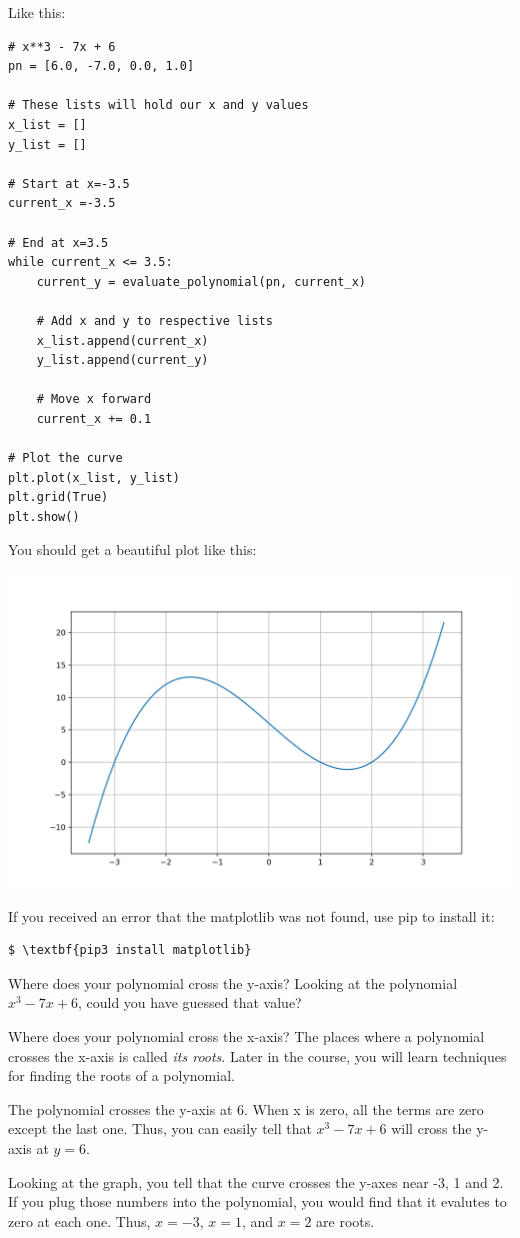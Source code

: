 Like this:
\begin{Verbatim}
# x**3 - 7x + 6
pn = [6.0, -7.0, 0.0, 1.0]

# These lists will hold our x and y values
x_list = []
y_list = []

# Start at x=-3.5
current_x =-3.5

# End at x=3.5
while current_x <= 3.5:
    current_y = evaluate_polynomial(pn, current_x)

    # Add x and y to respective lists
    x_list.append(current_x)
    y_list.append(current_y)

    # Move x forward
    current_x += 0.1

# Plot the curve
plt.plot(x_list, y_list)
plt.grid(True)
plt.show()
\end{Verbatim}

You should get a beautiful plot like this:

\includegraphics[width=\textwidth]{polyplot1.png}

If you received an error that the matplotlib was not found, use pip to install it:
\begin{Verbatim}[commandchars=\\\{\}]
$ \textbf{pip3 install matplotlib}
\end{Verbatim}

\begin{Exercise}[title={Observations}, label=plotobservations]
  Where does your polynomial cross the y-axis? Looking at the
  polynomial $x^3 - 7x + 6$, could you have guessed that value?

  \vspace{20mm}
  
  Where does your polynomial cross the x-axis? The places where a
  polynomial crosses the x-axis is called \emph{its roots}. Later in
  the course, you will learn techniques for finding the roots of a
  polynomial.
\end{Exercise}
\begin{Answer}[ref=plotobservations]
  The polynomial crosses the y-axis at 6. When x is zero, all the terms are zero except the
  last one. Thus, you can easily tell that $x^3 - 7x + 6$ will cross the y-axis at $y=6$.

  Looking at the graph, you tell that the curve crosses the y-axes
  near -3, 1 and 2. If you plug those numbers into the polynomial, you
  would find that it evalutes to zero at each one. Thus, $x=-3$, $x=1$, and $x=2$ are roots.
\end{Answer}
